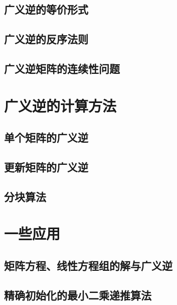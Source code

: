 \subsection{广义逆的等价形式}
\label{sub:广义逆的等价形式}

\begin{definition}
\end{definition}

\subsection{广义逆的反序法则}
\label{sub:广义逆的反序法则}

\subsection{广义逆矩阵的连续性问题}
\label{sub:广义逆矩阵的连续性问题}

\section{广义逆的计算方法}
\label{sec:广义逆的计算方法}

\subsection{单个矩阵的广义逆}
\label{sub:单个矩阵的广义逆}

\subsection{更新矩阵的广义逆}
\label{sub:更新矩阵的广义逆}

\subsection{分块算法}
\label{sub:分块算法}

\section{一些应用}
\label{sec:一些应用}

\subsection{矩阵方程、线性方程组的解与广义逆}
\label{sub:矩阵方程、线性方程组的解与广义逆}

\subsection{精确初始化的最小二乘递推算法}
\label{sub:精确初始化的最小二乘递推算法}


